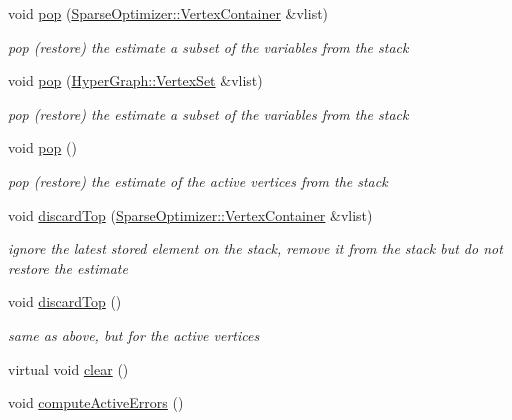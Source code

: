 \begin{DoxyCompactItemize}
void \mbox{\hyperlink{classg2o_1_1_sparse_optimizer_a57dbbb584122c6cfa292bb79d8fcd7ad}{pop}} (\mbox{\hyperlink{classg2o_1_1_hyper_graph_a9339534c99300a0ddac87ba976ef188c}{Sparse\+Optimizer\+::\+Vertex\+Container}} \&vlist)
\begin{DoxyCompactList}\small\item\em pop (restore) the estimate a subset of the variables from the stack \end{DoxyCompactList}\item 
void \mbox{\hyperlink{classg2o_1_1_sparse_optimizer_aa6688f8636bf89ef919d72947692d59c}{pop}} (\mbox{\hyperlink{classg2o_1_1_hyper_graph_a703938cdb4bb636860eed55a2489d70c}{Hyper\+Graph\+::\+Vertex\+Set}} \&vlist)
\begin{DoxyCompactList}\small\item\em pop (restore) the estimate a subset of the variables from the stack \end{DoxyCompactList}\item 
void \mbox{\hyperlink{classg2o_1_1_sparse_optimizer_ad2f7f62ebe17b40e050f0525db64355b}{pop}} ()
\begin{DoxyCompactList}\small\item\em pop (restore) the estimate of the active vertices from the stack \end{DoxyCompactList}\item 
void \mbox{\hyperlink{classg2o_1_1_sparse_optimizer_ac6344493dc9f66d5443759ff9f2abf6c}{discard\+Top}} (\mbox{\hyperlink{classg2o_1_1_hyper_graph_a9339534c99300a0ddac87ba976ef188c}{Sparse\+Optimizer\+::\+Vertex\+Container}} \&vlist)
\begin{DoxyCompactList}\small\item\em ignore the latest stored element on the stack, remove it from the stack but do not restore the estimate \end{DoxyCompactList}\item 
void \mbox{\hyperlink{classg2o_1_1_sparse_optimizer_a20ed9e9f1201bfb874456a8d30f169fb}{discard\+Top}} ()
\begin{DoxyCompactList}\small\item\em same as above, but for the active vertices \end{DoxyCompactList}\item 
virtual void \mbox{\hyperlink{classg2o_1_1_sparse_optimizer_a4881e4ac9ba9a58d4e249dc03ef9683d}{clear}} ()
\item 
void \mbox{\hyperlink{classg2o_1_1_sparse_optimizer_a09572668aa85b75a5bebf7b66401ce8f}{compute\+Active\+Errors}} ()

\end{DoxyCompactItemize}
